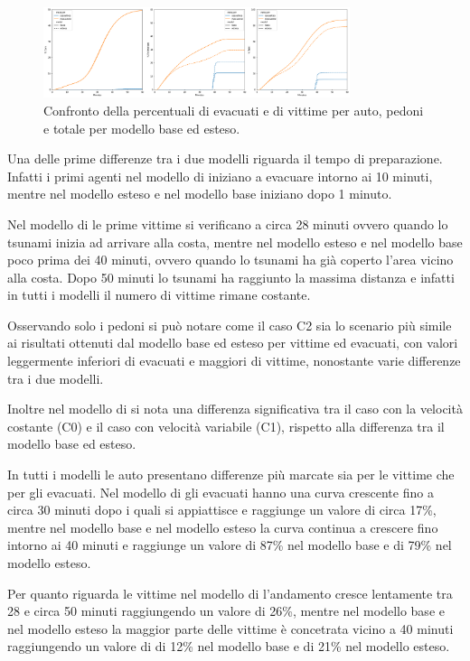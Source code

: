 \begin{figure}[p]
    \centering
    \includegraphics[width=0.8\textwidth]{images/analisi/WANG_comparison2.png}
    \caption{Confronto della percentuali di evacuati e di vittime per auto, pedoni e totale per modello base ed esteso.}
    \label{fig:analisi-comparison-wang2}
\end{figure}

Una delle prime differenze tra i due modelli riguarda il tempo di preparazione. Infatti i primi agenti nel modello di
\textcite{wang2021novel} iniziano a evacuare intorno ai 10 minuti, mentre nel modello esteso e nel modello base iniziano
dopo 1 minuto.

Nel modello di \textcite{wang2021novel} le prime vittime si verificano a circa 28 minuti ovvero quando lo tsunami inizia ad arrivare alla costa,
mentre nel modello esteso e nel modello base poco prima dei 40 minuti, ovvero quando lo tsunami ha già coperto l'area vicino alla costa.
Dopo 50 minuti lo tsunami ha raggiunto la massima distanza e infatti in tutti i modelli il numero di vittime rimane costante.

Osservando solo i pedoni si può notare come il caso C2 sia lo scenario più simile ai risultati
ottenuti dal modello base ed esteso per vittime ed evacuati, con valori leggermente inferiori di evacuati e maggiori di vittime,
nonostante varie differenze tra i due modelli.

Inoltre nel modello di \textcite{wang2021novel} si nota una differenza significativa
tra il caso con la velocità costante (C0) e il caso con velocità variabile (C1),
rispetto alla differenza tra il modello base ed esteso.

In tutti i modelli le auto presentano differenze più marcate sia per le vittime che per gli evacuati.
Nel modello di \textcite{wang2021novel} gli evacuati hanno una curva crescente fino a circa 30 minuti dopo i quali si appiattisce e raggiunge un valore di circa 17\%,
mentre nel modello base e nel modello esteso la curva continua a crescere fino intorno ai 40 minuti e raggiunge un valore di 87\% nel modello base e di 79\% nel modello esteso.

Per quanto riguarda le vittime nel modello di \textcite{wang2021novel} l'andamento cresce lentamente tra 28 e circa 50 minuti raggiungendo un valore di 26\%, mentre nel
modello base e nel modello esteso la maggior parte delle vittime è concetrata vicino a 40 minuti raggiungendo un valore di di 12\% nel modello base e di 21\% nel modello esteso.

